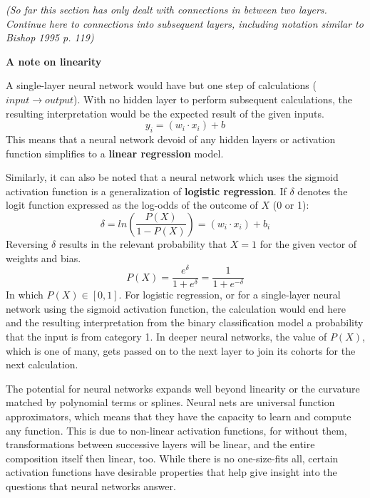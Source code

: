 \textit{(So far this section has only dealt with connections in between two layers.  Continue here to connections into subsequent layers, including notation similar to Bishop 1995 p. 119)}

\textbf{A note on linearity}

A single-layer neural network would have but one step of calculations ($input \rightarrow output$).  With no hidden layer to perform subsequent calculations, the resulting interpretation would be the expected result of the given inputs.
$$
y_i = (w_i \cdot x_i) + b
$$
This means that a neural network devoid of any hidden layers or activation function simplifies to a \textbf{linear regression} model. \cite{sharma2017activation}




Similarly, it can also be noted that a neural network which uses the sigmoid activation function is a generalization of \textbf{logistic regression}. \cite{dreiseitl2002logistic} \cite{schumacher1996neural}  If $\delta$ denotes the logit function expressed as the log-odds of the outcome of $X$ (0 or 1):
$$
\delta = ln \left( \frac{P(X)}{1-P(X)} \right) = (w_i \cdot x_i) + b_i 
$$
Reversing $\delta$ results in the relevant probability that $X = 1$ for the given vector of weights and bias.
$$
P(X) = \frac{e^\delta}{1+e^\delta} = \frac{1}{1+e^{-\delta}}
$$
In which $P(X) \in [0,1]$.  For logistic regression, or for a single-layer neural network using the sigmoid activation function, the calculation would end here and the resulting interpretation from the binary classification model a probability that the input is from category 1.  In deeper neural networks, the value of $P(X)$, which is one of many, gets passed on to the next layer to join its cohorts for the next calculation.

The potential for neural networks expands well beyond linearity or the curvature matched by polynomial terms or splines.  Neural nets are universal function approximators, which means that they have the capacity to learn and compute any function. \cite{sharma2017activation} This is due to non-linear activation functions, for without them, transformations between successive layers will be linear, and the entire composition itself then linear, too. \cite{bishop1995}  While there is no one-size-fits all, certain activation functions have desirable properties that help give insight into the questions that neural networks answer.


